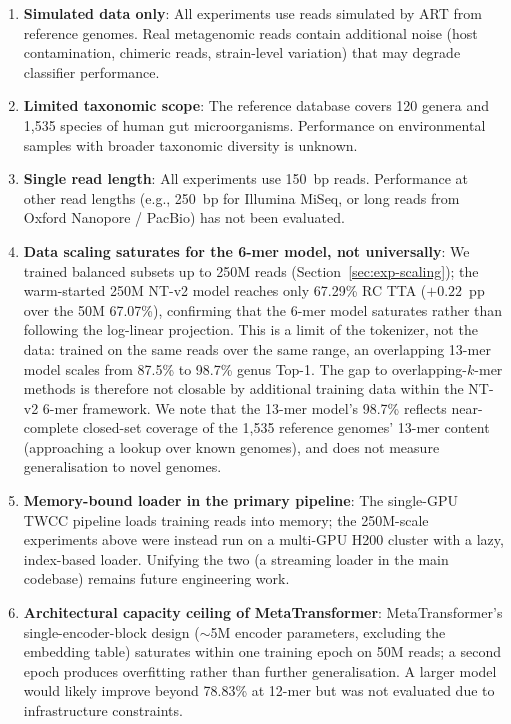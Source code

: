 \begin{enumerate}
    \item \textbf{Simulated data only}: All experiments use reads simulated by ART from reference genomes. Real metagenomic reads contain additional noise (host contamination, chimeric reads, strain-level variation) that may degrade classifier performance.
    
    \item \textbf{Limited taxonomic scope}: The reference database covers 120 genera and 1,535 species of human gut microorganisms. Performance on environmental samples with broader taxonomic diversity is unknown.
    
    \item \textbf{Single read length}: All experiments use 150~bp reads. Performance at other read lengths (e.g., 250~bp for Illumina MiSeq, or long reads from Oxford Nanopore / PacBio) has not been evaluated.
    
    \item \textbf{Data scaling saturates for the 6-mer model, not universally}: We trained balanced subsets up to 250M reads (Section~\ref{sec:exp-scaling}); the warm-started 250M NT-v2 model reaches only 67.29\% RC TTA ($+0.22$~pp over the 50M 67.07\%), confirming that the 6-mer model saturates rather than following the log-linear projection. This is a limit of the tokenizer, not the data: trained on the same reads over the same range, an overlapping 13-mer model scales from 87.5\% to 98.7\% genus Top-1. The gap to overlapping-$k$-mer methods is therefore not closable by additional training data within the NT-v2 6-mer framework. We note that the 13-mer model's 98.7\% reflects near-complete closed-set coverage of the 1{,}535 reference genomes' 13-mer content (approaching a lookup over known genomes), and does not measure generalisation to novel genomes.

    \item \textbf{Memory-bound loader in the primary pipeline}: The single-GPU TWCC pipeline loads training reads into memory; the 250M-scale experiments above were instead run on a multi-GPU H200 cluster with a lazy, index-based loader. Unifying the two (a streaming loader in the main codebase) remains future engineering work.
    
    \item \textbf{Architectural capacity ceiling of MetaTransformer}: MetaTransformer's single-encoder-block design (${\sim}$5M encoder parameters, excluding the embedding table) saturates within one training epoch on 50M reads; a second epoch produces overfitting rather than further generalisation. A larger model would likely improve beyond 78.83\% at 12-mer but was not evaluated due to infrastructure constraints.


\end{enumerate}
